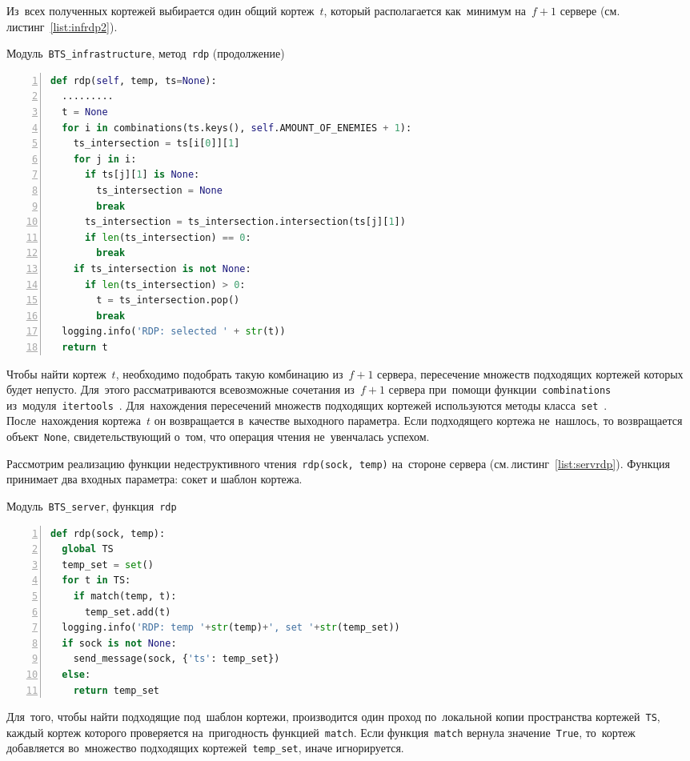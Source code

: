Из~всех полученных кортежей выбирается один общий кортеж~$t$, который располагается как~минимум на~$f + 1$ сервере (см.\,листинг~\ref{list:infrdp2}).
\begin{ListingEnv}\caption{Модуль~\texttt{BTS\_infrastructure}, метод~\texttt{rdp} (продолжение)}\label{list:infrdp2}
	\begin{lstlisting}[language=Python, numbers=left]
def rdp(self, temp, ts=None):
  .........
  t = None
  for i in combinations(ts.keys(), self.AMOUNT_OF_ENEMIES + 1):
    ts_intersection = ts[i[0]][1]
    for j in i:
      if ts[j][1] is None:
        ts_intersection = None
        break
      ts_intersection = ts_intersection.intersection(ts[j][1])
      if len(ts_intersection) == 0:
        break
    if ts_intersection is not None:
      if len(ts_intersection) > 0:
        t = ts_intersection.pop()
        break
  logging.info('RDP: selected ' + str(t))
  return t
	\end{lstlisting}
\end{ListingEnv}
Чтобы найти кортеж~$t$, необходимо подобрать такую комбинацию из~$f + 1$ сервера, пересечение множеств подходящих кортежей которых будет непусто. Для~этого рассматриваются всевозможные сочетания из~$f + 1$ сервера при~помощи функции~\texttt{combinations} из~модуля~\texttt{itertools}~\autocite{itertools}. Для~нахождения пересечений множеств подходящих кортежей используются методы класса~\texttt{set}~\autocite{set}. После~нахождения кортежа~$t$ он возвращается в~качестве выходного параметра. Если подходящего кортежа не~нашлось, то возвращается объект~\texttt{None}, свидетельствующий о~том, что операция чтения не~увенчалась успехом.

Рассмотрим реализацию функции недеструктивного чтения~\texttt{rdp(sock, temp)} на~стороне сервера (см.\,листинг~\ref{list:servrdp}). Функция принимает два входных параметра: сокет и шаблон кортежа.
\begin{ListingEnv}\caption{Модуль~\texttt{BTS\_server}, функция~\texttt{rdp}}\label{list:servrdp}
	\begin{lstlisting}[language=Python, numbers=left]
def rdp(sock, temp):
  global TS
  temp_set = set()
  for t in TS:
    if match(temp, t):
      temp_set.add(t) 
  logging.info('RDP: temp '+str(temp)+', set '+str(temp_set))
  if sock is not None:
    send_message(sock, {'ts': temp_set})
  else:
    return temp_set
	\end{lstlisting}
\end{ListingEnv}
Для~того, чтобы найти подходящие под~шаблон кортежи, производится один проход по~локальной копии пространства кортежей~\texttt{TS}, каждый кортеж которого проверяется на~пригодность функцией~\texttt{match}. Если функция~\texttt{match} вернула значение~\texttt{True}, то~кортеж добавляется во~множество подходящих кортежей~\texttt{temp_set}, иначе игнорируется.

